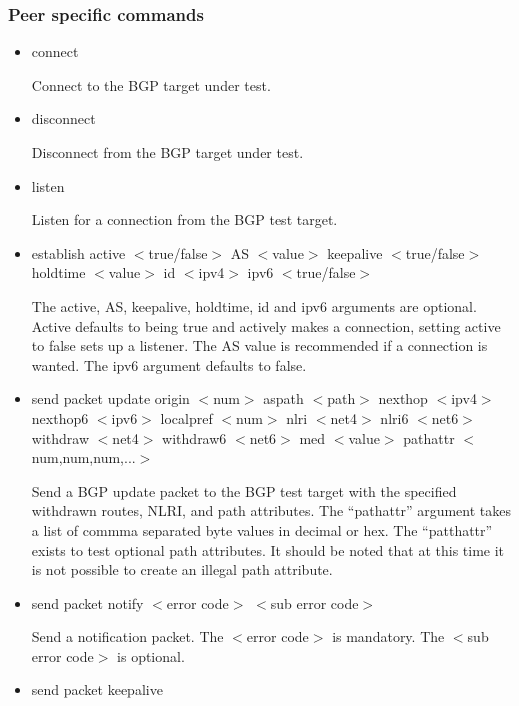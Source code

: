 \documentclass[11pt]{article}
\begin{document}
\subsubsection{Peer specific commands}

\begin{itemize}

\item connect

  Connect to the BGP target under test.

\item disconnect

  Disconnect from the BGP target under test.

\item listen 

  Listen for a connection from the BGP test target.

\item {\sf establish
  active $<$true/false$>$
  AS $<$value$>$
  keepalive $<$true/false$>$
  holdtime $<$value$>$ 
  id $<$ipv4$>$}
  ipv6 $<$true/false$>$

  The active, AS, keepalive, holdtime, id and ipv6 arguments are
  optional. Active defaults to being true and actively makes a
  connection, setting active to false sets up a listener. The AS value
  is recommended if a connection is wanted. The ipv6 argument defaults
  to false.

\item {\sf send packet update 
  origin $<$num$>$ 
  aspath $<$path$>$ 
  nexthop $<$ipv4$>$ 
  nexthop6 $<$ipv6$>$ 
  localpref $<$num$>$
  nlri $<$net4$>$
  nlri6 $<$net6$>$
  withdraw $<$net4$>$
  withdraw6 $<$net6$>$
  med $<$value$>$
  pathattr $<$num,num,num,...$>$}

  Send a BGP update packet to the BGP test target with the specified
  withdrawn routes, NLRI, and path attributes. The ``pathattr''
  argument takes a list of commma separated byte values in decimal or
  hex. The ``patthattr'' exists to test optional path attributes. It
  should be noted that at this time it is not possible to create an
  illegal path attribute.

\item {\sf send packet notify $<$error code$>$ $<$sub error code$>$}

  Send a notification packet. The $<$error code$>$ is mandatory. The
  $<$sub error code$>$ is optional.

\item {\sf send packet keepalive}


\end{itemize}
\end{document}
